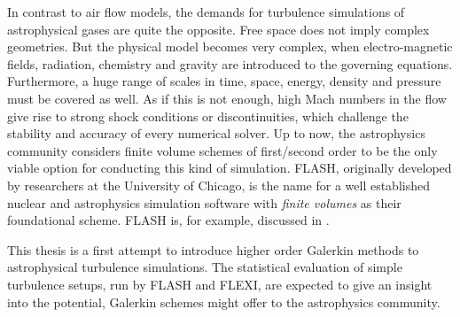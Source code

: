 In contrast to air flow models, the demands for turbulence simulations of
astrophysical gases are quite the opposite. Free space does not imply complex
geometries. But the physical model becomes very complex, when electro-magnetic
fields, radiation, chemistry and gravity are introduced to the governing
equations.  Furthermore, a huge range of scales in time, space, energy, density
and pressure must be covered as well. As if this is not enough, high Mach
numbers in the flow give rise to strong shock conditions or discontinuities,
which challenge the stability and accuracy of every numerical solver. Up to
now, the astrophysics community considers finite volume schemes of first/second
order to be the only viable option for conducting this kind of simulation.
FLASH\footnotemark[2], originally developed by researchers at the University of
Chicago, is the name for a well established nuclear and astrophysics simulation
software with \emph{finite volumes} as their foundational scheme. FLASH is, for
example, discussed in \cite{fryxell2001adaptive,lee2011progress,walch2015silcc}.

This thesis is a first attempt to introduce higher order Galerkin methods to
astrophysical turbulence simulations. The statistical evaluation of simple
turbulence setups, run by FLASH and FLEXI, are expected to give an insight into
the potential, Galerkin schemes might offer to the astrophysics community.


\newpage
